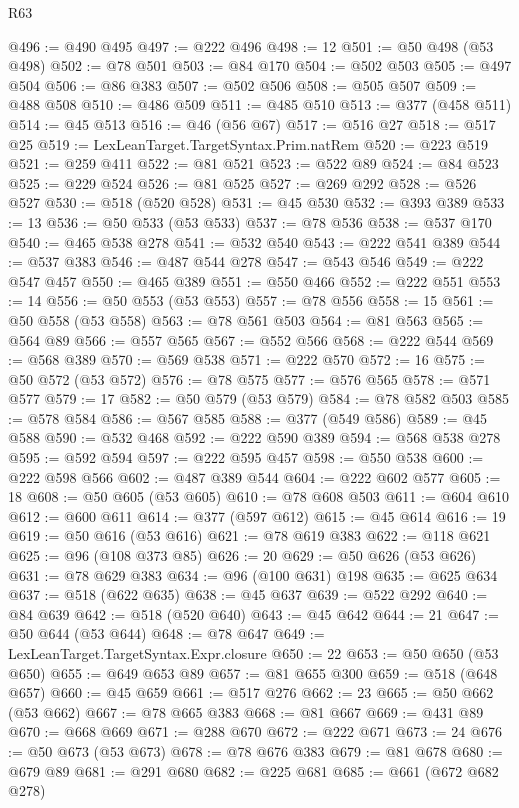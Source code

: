 \begin{lexlean}{R63}
\begin{coremodule}
@496 := @490 @495
@497 := @222 @496
@498 := 12
@501 := @50 @498 (@53 @498)
@502 := @78 @501
@503 := @84 @170
@504 := @502 @503
@505 := @497 @504
@506 := @86 @383
@507 := @502 @506
@508 := @505 @507
@509 := @488 @508
@510 := @486 @509
@511 := @485 @510
@513 := @377 (@458 @511)
@514 := @45 @513
@516 := @46 (@56 @67)
@517 := @516 @27
@518 := @517 @25
@519 := LexLeanTarget.TargetSyntax.Prim.natRem
@520 := @223 @519
@521 := @259 @411
@522 := @81 @521
@523 := @522 @89
@524 := @84 @523
@525 := @229 @524
@526 := @81 @525
@527 := @269 @292
@528 := @526 @527
@530 := @518 (@520 @528)
@531 := @45 @530
@532 := @393 @389
@533 := 13
@536 := @50 @533 (@53 @533)
@537 := @78 @536
@538 := @537 @170
@540 := @465 @538 @278
@541 := @532 @540
@543 := @222 @541 @389
@544 := @537 @383
@546 := @487 @544 @278
@547 := @543 @546
@549 := @222 @547 @457
@550 := @465 @389
@551 := @550 @466
@552 := @222 @551
@553 := 14
@556 := @50 @553 (@53 @553)
@557 := @78 @556
@558 := 15
@561 := @50 @558 (@53 @558)
@563 := @78 @561 @503
@564 := @81 @563
@565 := @564 @89
@566 := @557 @565
@567 := @552 @566
@568 := @222 @544
@569 := @568 @389
@570 := @569 @538
@571 := @222 @570
@572 := 16
@575 := @50 @572 (@53 @572)
@576 := @78 @575
@577 := @576 @565
@578 := @571 @577
@579 := 17
@582 := @50 @579 (@53 @579)
@584 := @78 @582 @503
@585 := @578 @584
@586 := @567 @585
@588 := @377 (@549 @586)
@589 := @45 @588
@590 := @532 @468
@592 := @222 @590 @389
@594 := @568 @538 @278
@595 := @592 @594
@597 := @222 @595 @457
@598 := @550 @538
@600 := @222 @598 @566
@602 := @487 @389 @544
@604 := @222 @602 @577
@605 := 18
@608 := @50 @605 (@53 @605)
@610 := @78 @608 @503
@611 := @604 @610
@612 := @600 @611
@614 := @377 (@597 @612)
@615 := @45 @614
@616 := 19
@619 := @50 @616 (@53 @616)
@621 := @78 @619 @383
@622 := @118 @621
@625 := @96 (@108 @373 @85)
@626 := 20
@629 := @50 @626 (@53 @626)
@631 := @78 @629 @383
@634 := @96 (@100 @631) @198
@635 := @625 @634
@637 := @518 (@622 @635)
@638 := @45 @637
@639 := @522 @292
@640 := @84 @639
@642 := @518 (@520 @640)
@643 := @45 @642
@644 := 21
@647 := @50 @644 (@53 @644)
@648 := @78 @647
@649 := LexLeanTarget.TargetSyntax.Expr.closure
@650 := 22
@653 := @50 @650 (@53 @650)
@655 := @649 @653 @89
@657 := @81 @655 @300
@659 := @518 (@648 @657)
@660 := @45 @659
@661 := @517 @276
@662 := 23
@665 := @50 @662 (@53 @662)
@667 := @78 @665 @383
@668 := @81 @667
@669 := @431 @89
@670 := @668 @669
@671 := @288 @670
@672 := @222 @671
@673 := 24
@676 := @50 @673 (@53 @673)
@678 := @78 @676 @383
@679 := @81 @678
@680 := @679 @89
@681 := @291 @680
@682 := @225 @681
@685 := @661 (@672 @682 @278)

\end{coremodule}
\end{lexlean}
